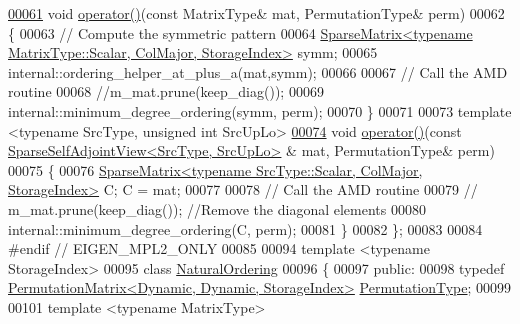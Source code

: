 \begin{DoxyCode}
\hyperlink{group___ordering_methods___module_afce433557abcba9e49fa81581a58fa51}{00061}     \textcolor{keywordtype}{void} \hyperlink{group___ordering_methods___module_afce433557abcba9e49fa81581a58fa51}{operator()}(\textcolor{keyword}{const} MatrixType& mat, PermutationType& perm)
00062     \{
00063       \textcolor{comment}{// Compute the symmetric pattern}
00064       \hyperlink{group___sparse_core___module_class_eigen_1_1_sparse_matrix}{SparseMatrix<typename MatrixType::Scalar, ColMajor, StorageIndex>}
       symm;
00065       internal::ordering\_helper\_at\_plus\_a(mat,symm); 
00066     
00067       \textcolor{comment}{// Call the AMD routine }
00068       \textcolor{comment}{//m\_mat.prune(keep\_diag());}
00069       internal::minimum\_degree\_ordering(symm, perm);
00070     \}
00071     
00073     \textcolor{keyword}{template} <\textcolor{keyword}{typename} SrcType, \textcolor{keywordtype}{unsigned} \textcolor{keywordtype}{int} SrcUpLo> 
\hyperlink{group___ordering_methods___module_a7f3fd7224b084f0f5655c97ea8eb6466}{00074}     \textcolor{keywordtype}{void} \hyperlink{group___ordering_methods___module_a7f3fd7224b084f0f5655c97ea8eb6466}{operator()}(\textcolor{keyword}{const} \hyperlink{group___sparse_core___module_class_eigen_1_1_sparse_self_adjoint_view}{SparseSelfAdjointView<SrcType, SrcUpLo>}
      & mat, PermutationType& perm)
00075     \{ 
00076       \hyperlink{group___sparse_core___module_class_eigen_1_1_sparse_matrix}{SparseMatrix<typename SrcType::Scalar, ColMajor, StorageIndex>}
       C; C = mat;
00077       
00078       \textcolor{comment}{// Call the AMD routine }
00079       \textcolor{comment}{// m\_mat.prune(keep\_diag()); //Remove the diagonal elements }
00080       internal::minimum\_degree\_ordering(C, perm);
00081     \}
00082 \};
00083 
00084 \textcolor{preprocessor}{#endif // EIGEN\_MPL2\_ONLY}
00085 
00094 \textcolor{keyword}{template} <\textcolor{keyword}{typename} StorageIndex>
00095 \textcolor{keyword}{class }\hyperlink{group___ordering_methods___module_class_eigen_1_1_natural_ordering}{NaturalOrdering}
00096 \{
00097   \textcolor{keyword}{public}:
00098     \textcolor{keyword}{typedef} \hyperlink{group___core___module}{PermutationMatrix<Dynamic, Dynamic, StorageIndex>}
       \hyperlink{group___core___module}{PermutationType};
00099     
00101     \textcolor{keyword}{template} <\textcolor{keyword}{typename} MatrixType>

\end{DoxyCode}
